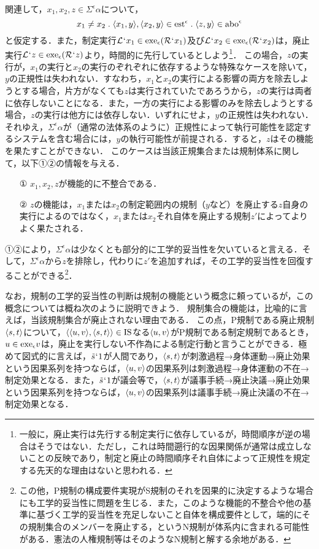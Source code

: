 関連して，$ x_1,x_2,z\in\varSigma^{\epsilon}\alpha $について，
\[
    x_1\neq x_2\con{1}\orp{x_1,y},\orp{x_2,y}\in\mathrm{est}^\epsilon\con{1}\orp{z,y}\in \mathrm{abo}^\epsilon
\]
と仮定する．また，制定実行$ \mathcal{L}{\mspace{1mu}{`}\mspace{1mu}} x_1\in\mathrm{exe}_{\epsilon}{(\mathcal{R}{\mspace{1mu}{`}\mspace{1mu}} x_1)} $及び$ \mathcal{L}{\mspace{1mu}{`}\mspace{1mu}} x_2\in\mathrm{exe}_{\epsilon}{(\mathcal{R}{\mspace{1mu}{`}\mspace{1mu}} x_2)} $は，廃止実行$ \mathcal{L}{\mspace{1mu}{`}\mspace{1mu}} z\in\mathrm{exe}_{\epsilon}{(\mathcal{R}{\mspace{1mu}{`}\mspace{1mu}} z)} $より，時間的に先行しているとしよう\footnote{
    一般に，廃止実行は先行する制定実行に依存しているが，時間順序が逆の場合はそうではない．ただし，これは時間遡行的な因果関係が通常は成立しないことの反映であり，制定と廃止の時間順序それ自体によって正規性を規定する先天的な理由はないと思われる．
}．
この場合，$z$の実行が，$x_1$の実行と$x_2$の実行のぞれぞれに依存するような特殊なケースを除いて，$y$の正規性は失われない．すなわち，$x_1$と$x_2$の実行による影響の両方を除去しようとする場合，片方がなくても$z$は実行されていたであろうから，$z$の実行は両者に依存しないことになる．また，一方の実行による影響のみを除去しようとする場合，$z$の実行は他方には依存しない．いずれにせよ，$y$の正規性は失われない．それゆえ，$ \varSigma^{\epsilon}\alpha $が（通常の法体系のように）正規性によって執行可能性を認定するシステムを含む場合には，$y$の執行可能性が前提される．すると，$z$はその機能を果たすことができない．
このケースは当該正規集合または規制体系に関して，以下①②の情報を与える．
\begin{enumerate}
    \item [①] $x_1,x_2,z$が機能的に不整合である．
    \item [②] $z$の機能は，$x_1$または$x_2$の制定範囲内の規制（$y$など）を廃止する$z$自身の実行によるのではなく，$x_1$または$x_2$それ自体を廃止する規制$z'$によってよりよく果たされる．
\end{enumerate}
①②により，$ \varSigma^{\epsilon}\alpha $は少なくとも部分的に工学的妥当性を欠いていると言える．そして，$ \varSigma^{\epsilon}\alpha $から$z$を排除し，代わりに$z'$を追加すれば，その工学的妥当性を回復することができる\footnote{
    この他，P規制の構成要件実現がS規制のそれを因果的に決定するような場合にも工学的妥当性に問題を生じる．また，このような機能的不整合や他の基準に基づく工学的妥当性を充足しないこと自体を構成要件として，端的にその規制集合のメンバーを廃止する，というN規制が体系内に含まれる可能性がある．憲法の人権規制等はそのようなN規制と解する余地がある．
}．

なお，規制の工学的妥当性の判断は規制の機能という概念に頼っているが，この概念については概ね次のように説明できよう．
規制集合の機能は，比喩的に言えば，当該規制集合が廃止されない理由である．
この点，P規制である廃止規制$ \langle s,t \rangle $について，$ \langle \langle u,v \rangle,\langle s,t \rangle \rangle\in \mathrm{IS} $なる$ \langle u,v \rangle $がP規制である制定規制であるとき，$u\in\mathrm{exe}_{\epsilon} v$は，廃止を実行しない不作為による制定行動と言うことができる．極めて図式的に言えば，$ \tilde{s}{\mspace{1mu}{`}\mspace{1mu}} 1 $が人間であり，$ \langle s,t \rangle $が刺激過程→身体運動→廃止効果という因果系列を持つならば，$ \langle u,v \rangle $の因果系列は刺激過程→身体運動の不在→制定効果となる．また，$ \tilde{s}{\mspace{1mu}{`}\mspace{1mu}} 1 $が議会等で，$ \langle s,t \rangle $が議事手続→廃止決議→廃止効果という因果系列を持つならば，$ \langle u,v \rangle $の因果系列は議事手続→廃止決議の不在→制定効果となる．

